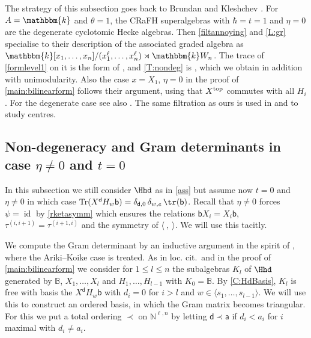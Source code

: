 \documentclass[a4paper,11pt]{amsart}
\let\<\langle
\let\>\rangle
\newcommand{\Tr}{\op{Tr}}
\numberwithin{equation}{subsection}
\theoremstyle{definition}
\theoremstyle{theorem}
\theoremstyle{remark}
\newcommand\ELL{\text{\scriptsize top}}%
\newcommand\Sym{W}
\newcommand\tl{l}
\newcommand\Kr[1]{K_{#1}}
\newcommand\ba{\mathsf{a}}
\newcommand\bd{\mathsf{d}}
\newcommand\bb{\mathsf{b}}
\newcommand\op{\operatorname}
\newcommand\taui[1][i]{\tau^{(#1)}}
\newcommand\N{\mathbb{N}}
\newcommand\kk{\mathbbm{k}}
\newcommand{\Bo}{\mathbb{B}}
\begin{document}
\begin{Remark}\label{R:BKfiltration}
The strategy of this subsection goes back to Brundan and Kleshchev \cite[Appendix~A]{BK:HigherSchurWeyl}. For $A=\kk$ and $\theta=1$, the CRaFH superalgebras with $\hbar=t=1$ and $\eta=0$ are the degenerate cyclotomic Hecke algebras. Then \autoref{filtannoying} and \autoref{L:gr} specialise to their description of the associated graded algebra as $\kk[x_1,\dots,x_n]/(x_1^\ell,\dots,x_n^\ell)\rtimes\kk\Sym_n$. The trace of \autoref{formlevel1} on it is the form of \cite[Lemma~A.1]{BK:HigherSchurWeyl}, and \autoref{T:nondeg} is \cite[Theorem~A.2]{BK:HigherSchurWeyl}, which we obtain in addition with unimodularity. Also the case $x=X_1$, $\eta=0$ in the proof of \autoref{main:bilinearform} follows their argument, using that $X^{\ELL}$ commutes with all $H_i$. For the degenerate case see also  \cite[Theorem~4.6]{MazStr}. The same filtration as ours is used in \cite{Brundan:degenCentre} and \cite[\S4.3]{Savage:AffineWreath} to study centres.
\end{Remark}


\subsection{Non-degeneracy and Gram determinants in case $\eta\not=0$ and $t=0$}
In this subsection we still consider $\Hhd$ as in \autoref{ass} but assume now $t=0$ and $\eta\not=0$ in which case
$\Tr(X^{\bd}H_w\bb)=\delta_{\bd,0}\,\delta_{w,e}\,\tr(\bb)$. Recall that $\eta\not=0$ forces $\psi=\op{id}$ by \autoref{rketasymm} which ensures the relations $\bb X_i=X_i\bb$, $\taui[i,i+1]=\taui[i+1,i]$ and  the symmetry of $\<\ ,\ \>$. We will use this tacitly.

We compute the Gram determinant by an inductive argument in the spirit of \cite{MalleMathas}, where the Ariki--Koike case is treated. As in loc. cit.\ and in the proof of \autoref{main:bilinearform} we consider for $1\leq \tl\leq n$ the subalgebras $\Kr{\tl}$ of $\Hhd$ generated by $\Bo$,
$X_1,\dots,X_{\tl}$ and $H_1,\dots,H_{\tl-1}$ with $\Kr{0}=\Bo$.  By \autoref{C:HdBasis}, $\Kr{\tl}$ is free with basis the $X^{\bd}H_w\bb$ with $d_i=0$ for $i>\tl$ and $w\in\langle s_1,\dots,s_{\tl-1}\rangle$. We will use this to construct an ordered basis, in which the Gram matrix becomes triangular. For this we put a total ordering $\prec$ on $\N^{\ell,n}$ by letting $\bd\prec\ba$ if $d_i<a_i$ for $i$ maximal with $d_i\not=a_i$.
\end{document}
